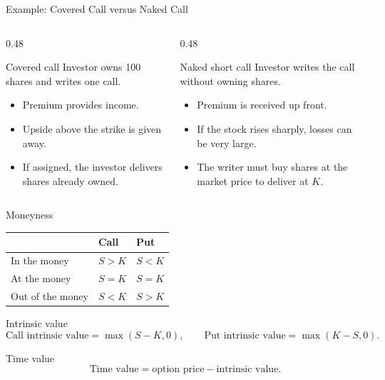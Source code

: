 \documentclass[aspectratio=169,11pt]{beamer}
\begin{document}
\begin{frame}{Example: Covered Call versus Naked Call}
    \begin{columns}[T]
        \begin{column}{0.48\textwidth}
            \begin{block}{Covered call}
                Investor owns 100 shares and writes one call.
                \begin{itemize}
                    \item Premium provides income.
                    \item Upside above the strike is given away.
                    \item If assigned, the investor delivers shares already owned.
                \end{itemize}
            \end{block}
        \end{column}
        \begin{column}{0.48\textwidth}
            \begin{alertblock}{Naked short call}
                Investor writes the call without owning shares.
                \begin{itemize}
                    \item Premium is received up front.
                    \item If the stock rises sharply, losses can be very large.
                    \item The writer must buy shares at the market price to deliver at \(K\).
                \end{itemize}
            \end{alertblock}
        \end{column}
    \end{columns}
\end{frame}

\begin{frame}{Moneyness}
    \begin{center}
    \begin{tabular}{lll}
        \toprule
        & Call & Put \\
        \midrule
        In the money & \(S>K\) & \(S<K\) \\
        At the money & \(S=K\) & \(S=K\) \\
        Out of the money & \(S<K\) & \(S>K\) \\
        \bottomrule
    \end{tabular}
    \end{center}

    \begin{block}{Intrinsic value}
        \[
            \text{Call intrinsic value}=\max(S-K,0),
            \qquad
            \text{Put intrinsic value}=\max(K-S,0).
        \]
    \end{block}

    \begin{block}{Time value}
        \[
            \text{Time value}=\text{option price}-\text{intrinsic value}.
        \]
    \end{block}
\end{frame}
\end{document}
